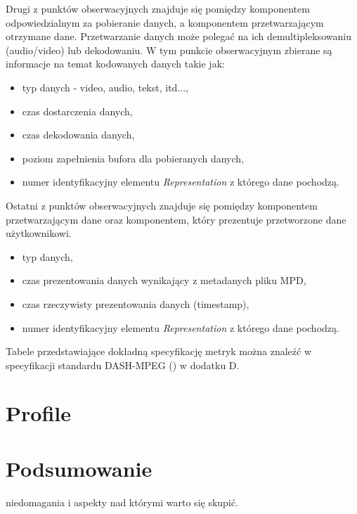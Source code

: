 Drugi z punktów obserwacyjnych znajduje się pomiędzy komponentem odpowiedzialnym za pobieranie danych, a komponentem przetwarzającym otrzymane dane. Przetwarzanie danych może polegać na ich demultipleksowaniu (audio/video) lub dekodowaniu. W tym punkcie obserwacyjnym zbierane są informacje na temat kodowanych danych takie jak:
\begin{itemize}
\item typ danych - video, audio, tekst, itd...,
\item czas dostarczenia danych,
\item czas dekodowania danych,
\item poziom zapełnienia bufora dla pobieranych danych,
\item numer identyfikacyjny elementu \textit{Representation} z którego dane pochodzą.
\end{itemize} 

Ostatni z punktów obserwacyjnych znajduje się pomiędzy komponentem przetwarzającym dane oraz komponentem, który prezentuje przetworzone dane użytkownikowi.
\begin{itemize}
\item typ danych,
\item czas prezentowania danych wynikający z metadanych pliku MPD,
\item czas rzeczywisty prezentowania danych (timestamp),
\item numer identyfikacyjny elementu \textit{Representation} z którego dane pochodzą.
\end{itemize}

Tabele przedstawiające dokładną specyfikację metryk można znaleźć w specyfikacji standardu DASH-MPEG (\cite{ISO-IEC-DASH}) w dodatku D.

\section{Profile}
\label{sec:profile}

\section{Podsumowanie}
niedomagania i aspekty nad którymi warto się skupić.
